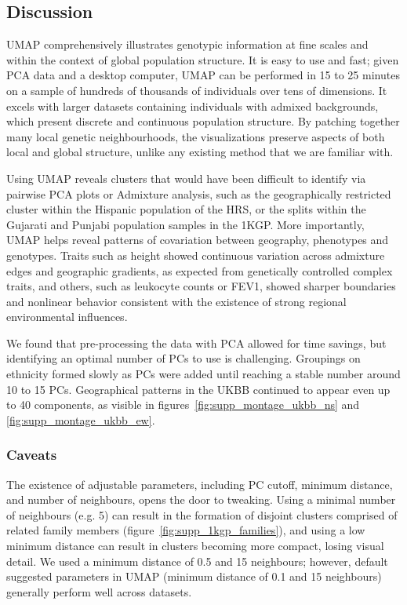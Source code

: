 \documentclass[12pt]{pnas-new}
\begin{document}
\subsection*{Discussion}
UMAP comprehensively illustrates genotypic information at fine scales and within the context of global population structure. It is easy to use and fast; given PCA data and a desktop computer, UMAP can be performed in 15 to 25 minutes on a sample of hundreds of thousands of individuals over tens of dimensions. It excels with larger datasets containing individuals with admixed backgrounds, which present discrete and continuous population structure. By patching together many local genetic neighbourhoods, the visualizations preserve aspects of both local and global structure, unlike any existing method that we are familiar with. 

Using UMAP reveals  clusters that would have been difficult to identify via pairwise PCA plots or Admixture analysis, such as the geographically restricted cluster within the Hispanic population of the HRS, or the splits within the Gujarati and Punjabi population samples in the 1KGP. More importantly, UMAP helps reveal patterns of covariation between geography, phenotypes and genotypes. Traits such as height showed continuous variation across admixture edges and geographic gradients, as expected from genetically controlled complex traits, and others, such as leukocyte counts or FEV1, showed sharper boundaries and nonlinear behavior consistent with the existence of strong regional environmental influences. 

We found that pre-processing the data with PCA allowed for time savings, but identifying an optimal number of PCs to use is challenging. Groupings on ethnicity formed slowly as PCs were added until reaching a stable number around 10 to 15 PCs. Geographical patterns in the UKBB continued to appear even up to 40 components, as visible in figures~\ref{fig:supp_montage_ukbb_ns} and \ref{fig:supp_montage_ukbb_ew}. 

\subsubsection*{Caveats}
The existence of adjustable parameters, including PC cutoff, minimum distance, and number of neighbours, opens the door to tweaking. Using a minimal number of neighbours (e.g. 5) can result in the formation of disjoint clusters comprised of related family members (figure~\ref{fig:supp_1kgp_families}), and using a low minimum distance can result in clusters becoming more compact, losing visual detail. We used a minimum distance of 0.5 and 15 neighbours; however, default suggested parameters in UMAP (minimum distance of 0.1 and 15 neighbours) generally perform well across datasets. 
\end{document}
